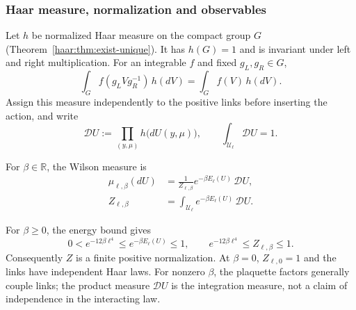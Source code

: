\subsubsection{Haar measure, normalization and observables}
Let $h$ be normalized Haar measure on the compact group $G$
(Theorem~\ref{haar:thm:exist-unique}). It has
$h(G)=1$ and is invariant under left and right multiplication. For an
integrable $f$ and fixed $g_L,g_R\in G$,
\begin{equation}\label{ym:haar-invariance}
 \int_G f(g_LVg_R^{-1})\,h(dV)=\int_G f(V)\,h(dV).
\end{equation}
Assign this measure independently to the positive links before inserting
the action, and write
\begin{equation}\label{ym:product-haar}
 \mathcal DU:=\prod_{(y,\mu)}h\big(dU(y,\mu)\big),
 \qquad \int_{\mathcal U_\ell}\mathcal DU=1.
\end{equation}

\begin{definition}\label{ym:def:wilson-measure}
For $\beta\in\mathbb R$, the Wilson measure is
\begin{align}
 \mu_{\ell,\beta}(dU)&=\frac{1}{Z_{\ell,\beta}}
             e^{-\beta E_\ell(U)}\,\mathcal DU,
 \label{ym:wilson-measure}\\
 Z_{\ell,\beta}&=\int_{\mathcal U_\ell}e^{-\beta E_\ell(U)}\,\mathcal DU.
 \label{ym:wilson-partition}
\end{align}
\end{definition}
For $\beta\ge0$, the energy bound gives
\begin{equation}\label{ym:finite-partition-bounds}
 0<e^{-12\beta\ell^4}\le e^{-\beta E_\ell(U)}\le1,
 \qquad e^{-12\beta\ell^4}\le Z_{\ell,\beta}\le1.
\end{equation}
Consequently $Z$ is a finite positive normalization. At $\beta=0$,
$Z_{\ell,0}=1$ and the links have independent Haar laws. For nonzero
$\beta$, the plaquette factors generally couple links; the product measure
$\mathcal DU$ is the integration measure, not a claim of independence in
the interacting law.

